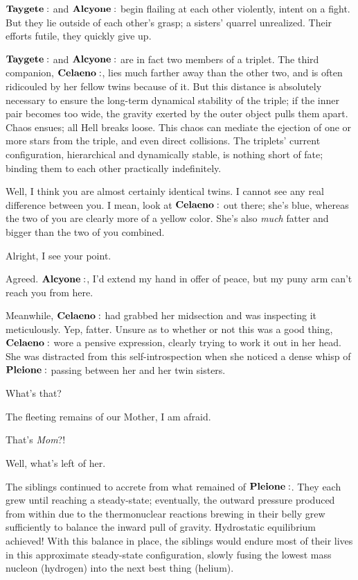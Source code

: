 \documentclass[main.tex]{subfiles}
\begin{document}
$\Taygete$ and $\Alcyone$ begin flailing at each other violently, intent on a fight.  But they lie outside of each other's grasp; a sisters' quarrel unrealized.  Their efforts futile, they quickly give up.  

$\Taygete$ and $\Alcyone$ are in fact two members of a triplet.  The third companion, $\Celaeno$, lies much farther away than the other two, and is often ridicouled by her fellow twins because of it.  But this distance is absolutely necessary to ensure the long-term dynamical stability of the triple;  if the inner pair becomes too wide, the gravity exerted by the outer object pulls them apart.  Chaos ensues; all Hell breaks loose.  This chaos can mediate the ejection of one or more stars from the triple, and even direct collisions.  The triplets' current configuration, hierarchical and dynamically stable, is nothing short of fate; binding them to each other practically indefinitely.

\Maia Well, I think you are almost certainly identical twins.  I cannot see any real difference between you.  I mean, look at $\Celaeno$ out there; she's blue, whereas the two of you are clearly more of a yellow color.  She's also \textit{much} fatter and bigger than the two of you combined.  

\Celaeno Alright, I see your point.

\Taygete Agreed.  $\Alcyone$, I'd extend my hand in offer of peace, but my puny arm can't reach you from here.

Meanwhile, $\Celaeno$ had grabbed her midsection and was inspecting it meticulously.  Yep, fatter.  Unsure as to whether or not this was a good thing, $\Celaeno$ wore a pensive expression, clearly trying to work it out in her head.  She was distracted from this self-introspection when she noticed a dense whisp of $\Pleione$ passing between her and her twin sisters.  

\Celaeno What's that?

\Maia The fleeting remains of our Mother, I am afraid.

\Electra That's \textit{Mom}?!

\Maia Well, what's left of her.

The siblings continued to accrete from what remained of $\Pleione$.  They each grew until reaching a steady-state; eventually, the outward pressure produced from within due to the thermonuclear reactions brewing in their belly grew sufficiently to balance the inward pull of gravity.  Hydrostatic equilibrium achieved!  With this balance in place, the siblings would endure most of their lives in this approximate steady-state configuration, slowly fusing the lowest mass nucleon (hydrogen) into the next best thing (helium).
\end{document}
